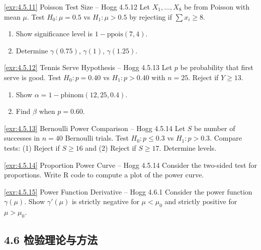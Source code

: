 \begin{exercise}{\ref{exr:4.5.11} Poisson Test Size – Hogg 4.5.12}\label{exr:4.5.11}
Let $X_1,\ldots,X_8$ be from Poisson with mean $\mu$. Test $H_0: \mu=0.5$ vs $H_1: \mu>0.5$ by rejecting if $\sum x_i \geq 8$.
\begin{enumerate}
\item[(a)] Show significance level is $1-\text{ppois}(7,4)$.
\item[(b)] Determine $\gamma(0.75)$, $\gamma(1)$, $\gamma(1.25)$.
\end{enumerate}
\end{exercise}

\begin{exercise}{\ref{exr:4.5.12} Tennis Serve Hypothesis – Hogg 4.5.13}\label{exr:4.5.12}
Let $p$ be probability that first serve is good. Test $H_0: p=0.40$ vs $H_1: p>0.40$ with $n=25$. Reject if $Y \geq 13$.
\begin{enumerate}
\item[(a)] Show $\alpha = 1-\text{pbinom}(12,25,0.4)$.
\item[(b)] Find $\beta$ when $p=0.60$.
\end{enumerate}
\end{exercise}

\begin{exercise}{\ref{exr:4.5.13} Bernoulli Power Comparison – Hogg 4.5.14}\label{exr:4.5.13}
Let $S$ be number of successes in $n=40$ Bernoulli trials. Test $H_0: p \leq 0.3$ vs $H_1: p > 0.3$. Compare tests: (1) Reject if $S \geq 16$ and (2) Reject if $S \geq 17$. Determine levels.
\end{exercise}

\begin{exercise}{\ref{exr:4.5.14} Proportion Power Curve – Hogg 4.5.14}\label{exr:4.5.14}
Consider the two-sided test for proportions. Write R code to compute a plot of the power curve.
\end{exercise}

\begin{exercise}{\ref{exr:4.5.15} Power Function Derivative – Hogg 4.6.1}\label{exr:4.5.15}
Consider the power function $\gamma(\mu)$. Show $\gamma'(\mu)$ is strictly negative for $\mu < \mu_0$ and strictly positive for $\mu > \mu_0$.
\end{exercise}

\subsection{4.6 检验理论与方法}\label{sec:exercises-4.6}

